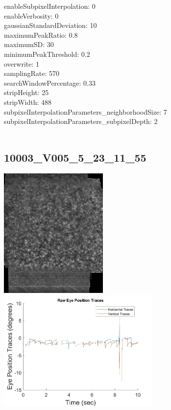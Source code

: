 \documentclass[11pt]{article}
\begin{document}
enableSubpixelInterpolation: 0\\
enableVerbosity: 0\\
gaussianStandardDeviation: 10\\
maximumPeakRatio: 0.8\\
maximumSD: 30\\
minimumPeakThreshold: 0.2\\
overwrite: 1\\
samplingRate: 570\\
searchWindowPercentage: 0.33\\
stripHeight: 25\\
stripWidth: 488\\
subpixelInterpolationParameters\_neighborhoodSize: 7\\
subpixelInterpolationParameters\_subpixelDepth: 2\\
\\
\newpage

\subsection{10003\_V005\_5\_23\_11\_55}
\includegraphics[width=0.40\textwidth, valign=m]{referenceframes/aoslo/10003_V005_5_23_11_55_dwt_nostim_gamscaled_bandfilt_refframe.jpg}
\includegraphics[width=0.60\textwidth, valign=m]{eyepositiontraces/aoslo/10003_V005_5_23_11_55.jpg}\\
\end{document}
